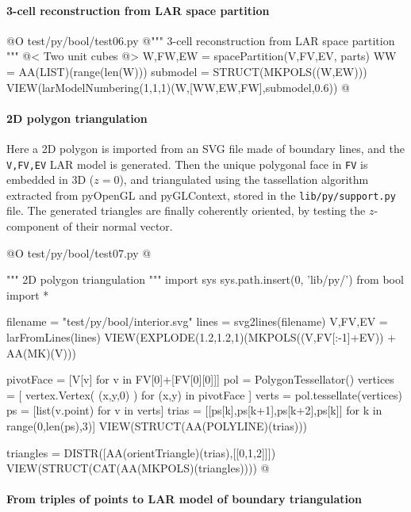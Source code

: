 \documentclass[11pt,oneside]{article}    %
\begin{document}
\paragraph{3-cell reconstruction from LAR space partition}
@O test/py/bool/test06.py
@{""" 3-cell reconstruction from LAR space partition """
@< Two unit cubes @>
W,FW,EW = spacePartition(V,FV,EV, parts)
WW = AA(LIST)(range(len(W)))
submodel = STRUCT(MKPOLS((W,EW)))
VIEW(larModelNumbering(1,1,1)(W,[WW,EW,FW],submodel,0.6))
@}



\paragraph{2D polygon triangulation}
Here a 2D polygon is imported from an SVG file made of boundary lines, and the \texttt{V,FV,EV}
LAR model is generated. Then the unique polygonal face in \texttt{FV} is embedded in 3D ($z=0$), and triangulated using the tassellation algorithm extracted from pyOpenGL and pyGLContext, stored in the \texttt{lib/py/support.py} file. The generated triangles are finally coherently oriented, by testing the $z$-component of their normal vector.

@O test/py/bool/test07.py
@{""" 2D polygon triangulation """
import sys
sys.path.insert(0, 'lib/py/')
from bool import *

filename = "test/py/bool/interior.svg"
lines = svg2lines(filename)    
V,FV,EV = larFromLines(lines)
VIEW(EXPLODE(1.2,1.2,1)(MKPOLS((V,FV[:-1]+EV)) + AA(MK)(V)))

pivotFace = [V[v] for v in FV[0]+[FV[0][0]]]
pol = PolygonTessellator()
vertices = [ vertex.Vertex( (x,y,0) ) for (x,y) in pivotFace  ]
verts = pol.tessellate(vertices)
ps = [list(v.point) for v in verts]
trias = [[ps[k],ps[k+1],ps[k+2],ps[k]] for k in range(0,len(ps),3)]
VIEW(STRUCT(AA(POLYLINE)(trias)))

triangles = DISTR([AA(orientTriangle)(trias),[[0,1,2]]])
VIEW(STRUCT(CAT(AA(MKPOLS)(triangles))))
@}


\paragraph{From triples of points to LAR model of boundary triangulation}
    
\end{document}

